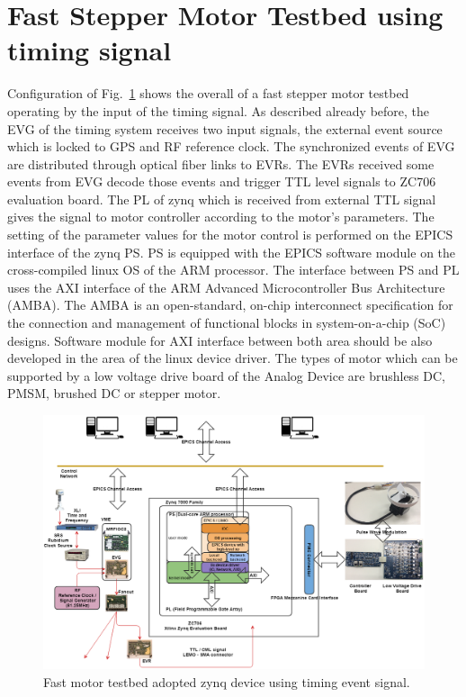 \documentclass[a4paper,
              ]{jacow}
\begin{document}
\section{Fast Stepper Motor Testbed using timing signal}
Configuration of Fig.~\ref{stepper} shows the overall of a fast stepper motor testbed operating by the input of the timing signal. As described already before, the EVG of the timing system receives two input signals, the external event source which is locked to GPS and RF reference clock. The synchronized events of EVG are distributed through optical fiber links to EVRs. The EVRs received some events from EVG decode those events and trigger TTL level signals to ZC706 evaluation board. The PL of zynq which is received from external TTL signal gives the signal to motor controller according to the motor's parameters. The setting of the parameter values for the motor control is performed on the EPICS interface of the zynq PS. PS is equipped with the EPICS software module on the cross-compiled linux OS of the ARM processor. The interface between PS and PL uses the AXI interface of the ARM Advanced Microcontroller Bus Architecture (AMBA). The AMBA\cite{amba-bus} is an open-standard, on-chip interconnect specification for the connection and management of functional blocks in system-on-a-chip (SoC) designs. Software module for AXI interface between both area should be also developed in the area of the linux device driver. The types of motor which can be supported by a low voltage drive board of the Analog Device\cite{analog} are brushless DC, PMSM, brushed DC or stepper motor. 

\begin{figure}[!tbh]
	\centering
	\includegraphics*[width=\textwidth,height=0.7\textwidth]{WEPGF124f3}
	\caption{Fast motor testbed adopted zynq device using timing event signal.}
	\label{stepper}
\end{figure}
\end{document}

